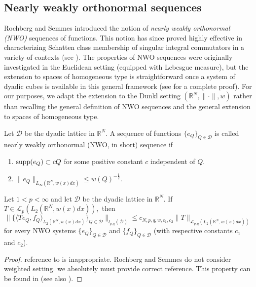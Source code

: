 \documentclass{amsart}
\numberwithin{equation}{section}
\begin{document}
\subsection{Nearly weakly  orthonormal sequences}
Rochberg and Semmes \cite{RS} introduced the notion of \emph{nearly weakly  orthonormal (NWO)} sequences of functions. This notion has since proved highly effective in characterizing Schatten class membership of  singular integral commutators in a variety of contexts (see \cite{FLLXarxiv,HKarxiv,MR4756021,MR4552581,MR4873796,LLW,RS,Zhangwei1,Zhangwei2}). The properties of NWO sequences were originally investigated in the Euclidean setting (equipped with Lebesgue measure), but the extension to spaces of homogeneous type is straightforward once a system of dyadic cubes is available in this general framework (see \cite[Section 13]{HKarxiv} for a complete proof).  For our purposes, we adapt  the extension to the Dunkl setting $(\mathbb{R}^N,\|\cdot\|,w)$ rather than recalling the general  definition
of NWO sequences and the general extension to spaces of homogeneous type.

\begin{definition} Let $\mathcal{D}$ be the dyadic lattice in $\mathbb{R}^N.$ A sequence of functions $\{e_Q\}_{Q\in\mathcal{D}}$ is called nearly weakly orthonormal (NWO, in short) sequence if
\begin{enumerate}[{\rm (i)}]
\item ${\rm supp}(e_Q)\subset cQ$ for some positive constant $c$ independent of $Q.$
\item $\|e_Q\|_{L_{\infty}(\mathbb{R}^N,w(x)dx)}\leq w(Q)^{-\frac12}.$
\end{enumerate}
\end{definition}

\begin{lemma}\label{NWO lower estimate}
Let $1<p<\infty$ and let $\mathcal{D}$ be the dyadic lattice in $\mathbb{R}^N.$
If $T\in\mathcal{L}_p(L_2(\mathbb{R}^N,w(x)dx)),$ then
$$\Big\|\Big\{\langle T e_Q,f_Q \rangle_{L_2(\mathbb{R}^N,w(x)dx)}\Big\}_{Q\in\mathcal{D}}\Big\|_{l_{p,q}(\mathcal{D})}\leq c_{N,p,q,w,c_1,c_2}\|T\|_{\mathcal{L}_{p,q}(L_2(\mathbb{R}^N,w(x)dx))}$$
for every NWO systems $\{e_Q\}_{Q\in\mathcal{D}}$ and $\{f_Q\}_{Q\in\mathcal{D}}$ (with respective constants $c_1$ and $c_2$).
\end{lemma}
\begin{proof} {\color{red} reference to \cite{RS} is inappropriate. Rochberg and Semmes do not consider weighted setting. we absolutely must provide correct reference.} This property can be found in  \cite[(1.10)]{RS} (see also \cite[Section 7]{HKarxiv}).
\end{proof}
\end{document}
